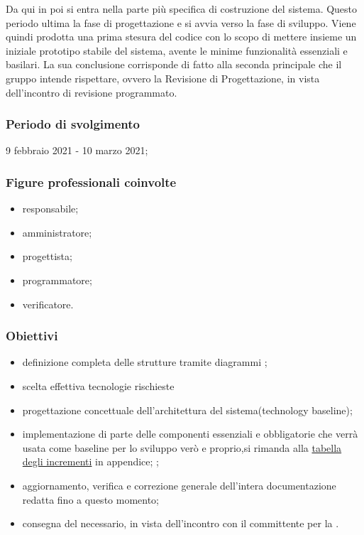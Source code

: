 Da qui in poi si entra nella parte più specifica di costruzione del sistema. Questo periodo ultima la fase di progettazione e si avvia verso la fase di sviluppo. Viene quindi prodotta una prima stesura del codice con lo scopo di mettere insieme un iniziale prototipo stabile del sistema, avente le minime funzionalità essenziali e basilari. La sua conclusione corrisponde di fatto alla seconda  principale che il gruppo \Gruppo{} intende rispettare, ovvero la Revisione di Progettazione, in vista dell'incontro di revisione programmato.
        
        \subsubsection{Periodo di svolgimento}
        9 febbraio 2021 - 10 marzo 2021;
        
        \subsubsection{Figure professionali coinvolte}
            \begin{itemize}
                \item responsabile;
                \item amministratore;
                \item progettista;
                \item programmatore;
                \item verificatore.
            \end{itemize}

        \subsubsection{Obiettivi}    
        \begin{itemize}
            \item definizione completa delle strutture tramite diagrammi ;
            \item scelta effettiva tecnologie rischieste

            \item progettazione concettuale dell'architettura del sistema(technology baseline);
            \item implementazione di parte delle componenti essenziali e obbligatorie che verrà usata come baseline per lo sviluppo verò e proprio,si rimanda alla\hypersetup{
                linkcolor=blue
            }
            \hyperlink{TabellaIncrementi}{tabella degli incrementi} in appendice;
            \hypersetup{
                linkcolor=black
            };
            \item aggiornamento, verifica e correzione generale dell'intera documentazione redatta fino a questo momento;
            \item consegna del  necessario, in vista dell'incontro con il committente per la \RP{}.
        \end{itemize}